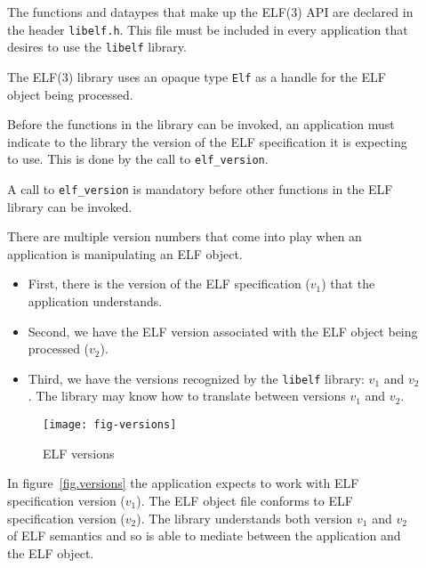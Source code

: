 \documentclass[a4paper,pdftex]{book}
\makeatletter
\newcommand{\function}[1]{\texttt{#1}}
\newcommand{\filename}[1]{\texttt{#1}}
\newcommand{\library}[1]{\texttt{#1}}
\newcommand{\type}[1]{\texttt{#1}}
\newenvironment{callout}[2][black]{%
  \begingroup\newcommand{\@cocolor}{#1}%
  \setlength{\shadowsize}{1.2pt}%
  \newcommand{\@cogroup}[1]{#2}}{\endgroup}
\newcommand{\@co}[1]{\shadowbox{\color{\@cocolor}#1}}
\newcommand{\coref}[1]{%
  \hypertarget{\@cogroup.#1.cr}{%
    \hyperlink{\@cogroup.#1.co}{\@co{#1}}}}
\makeatother
\begin{document}
\begin{callout}{prog1}
  

  \begin{description}
  \item[\coref{1}] The functions and dataypes that make up the ELF(3) API
    are declared in the header \filename{libelf.h}.  This file must be included
    in every application that desires to use the \library{libelf}
    library.%
    \index{libelf@\library{libelf}!header \filename{elf.h}}

  \item[\coref{2}] The ELF(3) library uses an opaque type \type{Elf} as a
    handle for the ELF object being processed.

  \item[\coref{4}] Before the functions in the library can be invoked, an
    application must indicate to the library the version of the ELF
    specification it is expecting to use.  This is done by the call to
    \function{elf\_version}.

    A call to \function{elf\_version} is mandatory before other
    functions in the ELF library can be invoked.

    There are multiple version numbers that come into play when an
    application is manipulating an ELF object.

    \begin{itemize}
    \item First, there is the version of the ELF specification ($v_1$)
      that the application understands.
    \item Second, we have the ELF version associated with the ELF
      object being processed ($v_2$).
    \item Third, we have the versions recognized by the
      \library{libelf} library: $v_1$ and $v_2$.  The library may know
      how to translate between versions $v_1$ and $v_2$.
    \end{itemize}

    \begin{figure}
      \begin{center}
        \texttt{[image: fig-versions]}
      \end{center}
      \caption{ELF versions}\label{fig.versions}
    \end{figure}

    In figure~\vref{fig.versions} the application expects to work with
    ELF specification version ($v_1$). The ELF object file conforms to
    ELF specification version ($v_2$).  The library understands both
    version $v_1$ and $v_2$ of ELF semantics and so is able to mediate
    between the application and the ELF object.


\end{description}
\end{callout}
\end{document}
